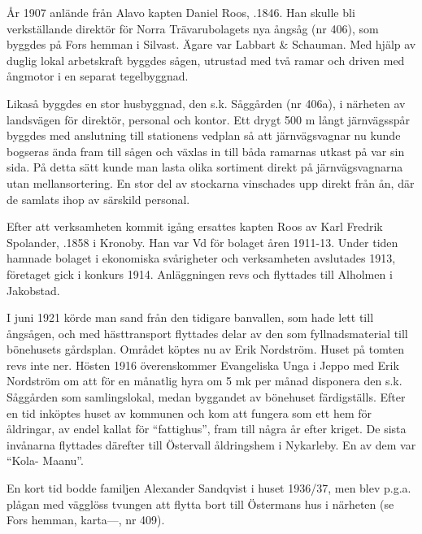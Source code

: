 År 1907 anlände från Alavo kapten Daniel Roos, .1846. Han skulle bli verkställande direktör för Norra Trävarubolagets nya ångsåg (nr 406), som byggdes på Fors hemman i Silvast. Ägare var Labbart \& Schauman. Med hjälp av duglig lokal arbetskraft byggdes sågen, utrustad med två ramar och driven med ångmotor i en separat tegelbyggnad.

Likaså byggdes en stor husbyggnad, den s.k. Såggården (nr 406a), i närheten av landsvägen för direktör, personal och kontor. Ett drygt 500 m långt järnvägsspår byggdes med anslutning till stationens vedplan så att järnvägsvagnar nu kunde bogseras ända fram till sågen och växlas in till båda ramarnas utkast på var sin sida. På detta sätt kunde man lasta olika sortiment direkt på järnvägsvagnarna utan mellansortering. En stor del av stockarna vinschades upp direkt från ån, där de samlats ihop av särskild personal.










Efter att verksamheten kommit igång ersattes kapten Roos av Karl Fredrik Spolander, .1858 i Kronoby. Han var Vd för bolaget åren 1911-13. Under tiden hamnade bolaget i ekonomiska svårigheter och verksamheten avslutades 1913, företaget gick i konkurs 1914. Anläggningen revs och flyttades till Alholmen i Jakobstad.

I juni 1921 körde man sand från den tidigare banvallen, som hade lett till ångsågen, och med hästtransport flyttades delar av den som fyllnadsmaterial till bönehusets gårdsplan. Området köptes nu av Erik Nordström. Huset på tomten revs inte ner. Hösten 1916 överenskommer Evangeliska Unga i Jeppo med Erik Nordström  om att för en månatlig hyra om 5 mk per månad disponera den s.k. Såggården som samlingslokal, medan byggandet av bönehuset färdigställs. Efter en tid inköptes huset av kommunen och kom att fungera som ett hem för åldringar, av endel kallat för ``fattighus'', fram till några år efter kriget. De sista invånarna flyttades därefter till Östervall åldringshem i Nykarleby. En av dem var ``Kola- Maanu''.

En kort tid bodde familjen Alexander Sandqvist i huset 1936/37, men blev p.g.a. plågan med vägglöss tvungen att flytta bort till Östermans hus i närheten (se Fors hemman, karta---, nr 409).

